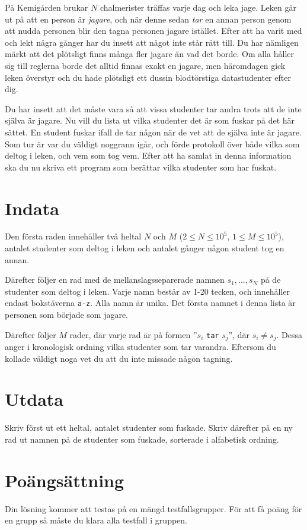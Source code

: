 På Kemigården brukar $N$ chalmerister träffas varje dag och leka jage.
Leken går ut på att en person är \emph{jagare}, 
och när denne sedan \emph{tar} en annan person genom att nudda personen blir den tagna personen jagare istället.
Efter att ha varit med och lekt några gånger har du insett att något inte står rätt till.
Du har nämligen märkt att det plötsligt finns många fler jagare än vad det borde.
Om alla håller sig till reglerna borde det alltid finnas exakt en jagare,
men häromdagen gick leken överstyr och du hade plötsligt ett dussin blodtörstiga datastudenter efter dig.

Du har insett att det måste vara så att vissa studenter tar andra trots att de inte själva är jagare.
Nu vill du lista ut vilka studenter det är som fuskar på det här sättet.
En student fuskar ifall de tar någon när de vet att de själva inte är jagare.
Som tur är var du väldigt noggrann igår, och förde protokoll över både vilka som deltog i leken, och vem som tog vem.
Efter att ha samlat in denna information ska du nu skriva ett program som berättar vilka studenter som har fuskat.

\section*{Indata}
Den första raden innehåller två heltal $N$ och $M$ ($2 \leq N \leq 10^5$, $1 \leq M \leq 10^5$), 
antalet studenter som deltog i leken
och antalet gånger någon student tog en annan.

Därefter följer en rad med de mellanslagsseparerade namnen $s_1, ..., s_N$ på de studenter som deltog i leken.
Varje namn består av 1-20 tecken, och innehåller endast bokstäverna \texttt{a-z}. 
Alla namn är unika.
Det första namnet i denna lista är personen som började som jagare.

Därefter följer $M$ rader, där varje rad är på formen ''$s_i$ \texttt{tar} $s_j$'', där $s_i \neq s_j$.
Dessa anger i kronologisk ordning vilka studenter som tar varandra.
Eftersom du kollade väldigt noga vet du att du inte missade någon tagning.

\section*{Utdata}
Skriv först ut ett heltal, antalet studenter som fuskade.
Skriv därefter på en ny rad ut namnen på de studenter som fuskade, 
sorterade i alfabetisk ordning.

\section*{Poängsättning}
Din lösning kommer att testas på en mängd testfallsgrupper.
För att få poäng för en grupp så måste du klara alla testfall i gruppen.

